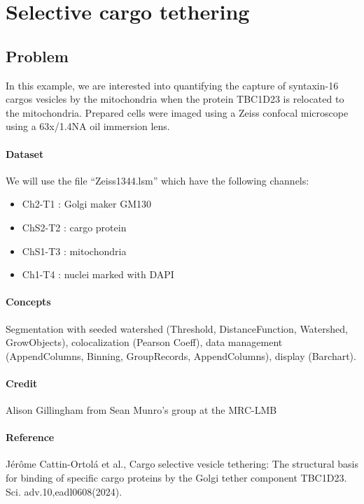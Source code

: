 \section{Selective cargo tethering}

\subsection{Problem}

In this example, we are interested into quantifying the capture of syntaxin-16 cargos vesicles by the mitochondria when the protein TBC1D23 is relocated to the mitochondria.  Prepared cells were imaged using a Zeiss confocal microscope using a 63x/1.4NA oil immersion lens.

\paragraph{Dataset} We will use the file ``Zeiss1344.lsm'' which have the following channels:
\begin{itemize}\setlength\itemsep{0em}
    \item Ch2-T1 : Golgi maker GM130
    \item ChS2-T2 : cargo protein
    \item ChS1-T3 : mitochondria
    \item Ch1-T4 : nuclei marked with DAPI
\end{itemize}

\paragraph{Concepts} Segmentation with seeded watershed (Threshold, DistanceFunction, Watershed, GrowObjects), colocalization (Pearson Coeff), data management (AppendColumns, Binning, GroupRecords, AppendColumns), display (Barchart).

\paragraph{Credit}  Alison Gillingham from Sean Munro's group at the MRC-LMB

\paragraph{Reference} Jérôme Cattin-Ortolá et al., Cargo selective vesicle tethering: The structural basis for binding of specific cargo proteins by the Golgi tether component TBC1D23. Sci. adv.10,eadl0608(2024). 

